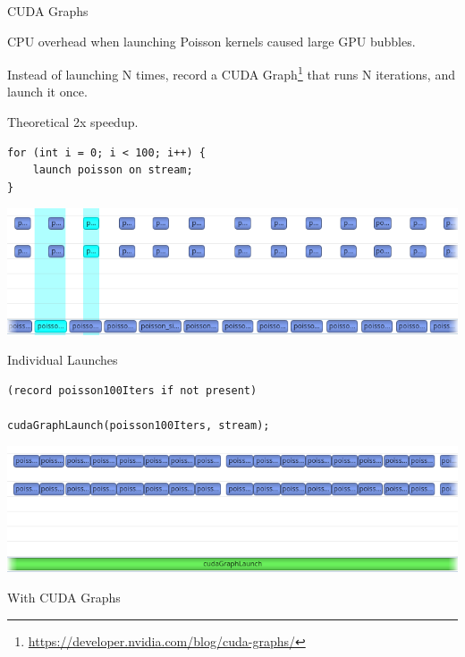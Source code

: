 \begin{frame}[fragile]{CUDA Graphs}
    
    \begin{wideitemize}
        \item CPU overhead when launching Poisson kernels caused large GPU bubbles.
        \item Instead of launching N times, record a CUDA Graph\footnote{\url{https://developer.nvidia.com/blog/cuda-graphs/}} that runs N iterations, and launch it once.
        \item Theoretical 2x speedup.
    \end{wideitemize}
    
    \vfill\null
    \begin{minipage}{0.48\textwidth}
        \begin{lstlisting}
for (int i = 0; i < 100; i++) {
    launch poisson on stream;
}\end{lstlisting}
    \includegraphics[width=\textwidth]{Presentation/images/cudagraphs_before.png}
    \begin{center}
        Individual Launches
    \end{center}
    \end{minipage}\hfill%
    \begin{minipage}{0.48\textwidth}
    \begin{lstlisting}
(record poisson100Iters if not present)

cudaGraphLaunch(poisson100Iters, stream);
\end{lstlisting}
\includegraphics[width=\textwidth]{Presentation/images/cudagraphs_after.png}
        \begin{center}
        With CUDA Graphs
        \end{center}
    \end{minipage}

\end{frame}